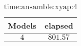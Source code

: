 \begin{table}[!ht]
	\centering
	\begin{tabular}{|c|c|}
		\hline
		Models & elapsed \\ \hline
		$4$ & $801.57$ \\ \hline
	\end{tabular}
	\caption{time:ansamble:xyap:4}
	\label{tab:time:ansamble:xyap:4}
\end{table}
